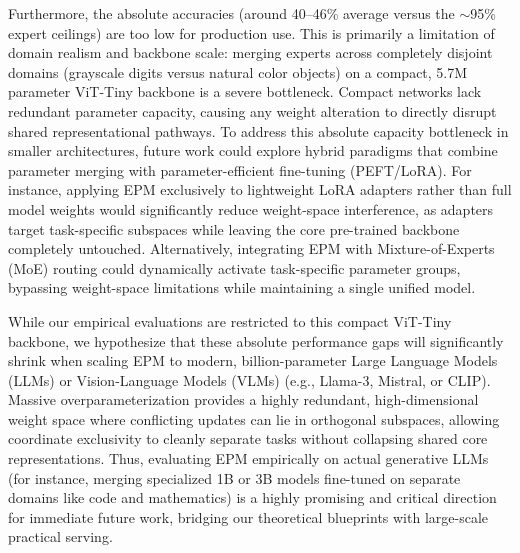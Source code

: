 Furthermore, the absolute accuracies (around 40--46\% average versus the $\sim$95\% expert ceilings) are too low for production use. This is primarily a limitation of domain realism and backbone scale: merging experts across completely disjoint domains (grayscale digits versus natural color objects) on a compact, 5.7M parameter ViT-Tiny backbone is a severe bottleneck. Compact networks lack redundant parameter capacity, causing any weight alteration to directly disrupt shared representational pathways. To address this absolute capacity bottleneck in smaller architectures, future work could explore hybrid paradigms that combine parameter merging with parameter-efficient fine-tuning (PEFT/LoRA). For instance, applying EPM exclusively to lightweight LoRA adapters rather than full model weights would significantly reduce weight-space interference, as adapters target task-specific subspaces while leaving the core pre-trained backbone completely untouched. Alternatively, integrating EPM with Mixture-of-Experts (MoE) routing could dynamically activate task-specific parameter groups, bypassing weight-space limitations while maintaining a single unified model. 

While our empirical evaluations are restricted to this compact ViT-Tiny backbone, we hypothesize that these absolute performance gaps will significantly shrink when scaling EPM to modern, billion-parameter Large Language Models (LLMs) or Vision-Language Models (VLMs) (e.g., Llama-3, Mistral, or CLIP). Massive overparameterization provides a highly redundant, high-dimensional weight space where conflicting updates can lie in orthogonal subspaces, allowing coordinate exclusivity to cleanly separate tasks without collapsing shared core representations. Thus, evaluating EPM empirically on actual generative LLMs (for instance, merging specialized 1B or 3B models fine-tuned on separate domains like code and mathematics) is a highly promising and critical direction for immediate future work, bridging our theoretical blueprints with large-scale practical serving.

